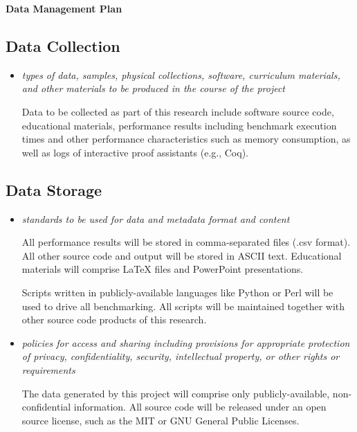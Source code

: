 \begin{center}
        {\large\bf\textsf{
            Data Management Plan}}
\end{center}


\subsection*{Data Collection}

\begin{itemize}
\item \emph{types of data, samples, physical collections, software, curriculum materials, and other materials to be produced in the course of the project}

Data to be collected as part of this research include software source
code, educational materials, performance results including benchmark
execution times and other performance characteristics such as memory
consumption, as well as logs of interactive proof assistants (e.g.,
Coq).

\end{itemize}


\subsection*{Data Storage}

\begin{itemize}
\item \emph{standards to be used for data and metadata format and content}

All performance results will be stored in comma-separated files (.csv
format). All other source code and output will be stored in ASCII
text. Educational materials will comprise LaTeX files and PowerPoint
presentations.

Scripts written in publicly-available languages like Python or Perl
will be used to drive all benchmarking. All scripts will be maintained
together with other source code products of this research.

\item \emph{policies for access and sharing including provisions for appropriate protection of privacy, confidentiality, security, intellectual property, or other rights or requirements}

The data generated by this project will comprise only
publicly-available, non-confidential information. All source code will
be released under an open source license, such as the MIT or GNU General
Public Licenses.

\end{itemize}


